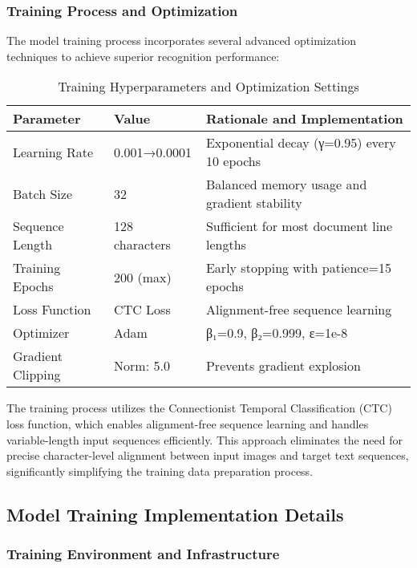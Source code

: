 \subsubsection{Training Process and Optimization}

The model training process incorporates several advanced optimization techniques to achieve superior recognition performance:

\begin{table}[H]
\centering
\caption{Training Hyperparameters and Optimization Settings}
\label{tab:training_config}
\begin{tabular}{|l|l|p{6cm}|}
\hline
\textbf{Parameter} & \textbf{Value} & \textbf{Rationale and Implementation} \\
\hline
Learning Rate & 0.001→0.0001 & Exponential decay (γ=0.95) every 10 epochs \\
\hline
Batch Size & 32 & Balanced memory usage and gradient stability \\
\hline
Sequence Length & 128 characters & Sufficient for most document line lengths \\
\hline
Training Epochs & 200 (max) & Early stopping with patience=15 epochs \\
\hline
Loss Function & CTC Loss & Alignment-free sequence learning \\
\hline
Optimizer & Adam & β₁=0.9, β₂=0.999, ε=1e-8 \\
\hline
Gradient Clipping & Norm: 5.0 & Prevents gradient explosion \\
\hline
\end{tabular}
\end{table}

The training process utilizes the Connectionist Temporal Classification (CTC) loss function, which enables alignment-free sequence learning and handles variable-length input sequences efficiently. This approach eliminates the need for precise character-level alignment between input images and target text sequences, significantly simplifying the training data preparation process.

\subsection{Model Training Implementation Details}

\subsubsection{Training Environment and Infrastructure}


